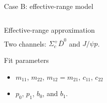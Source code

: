 \documentclass[aspectratio=169]{beamer}
\begin{document}
\begin{frame}[noframenumbering]{Case B: effective-range model}
\begin{columns}
\begin{column}{0.57\textwidth}
\begin{block}{Effective-range approximation}
\begin{align*}
            \end{align*}
            Two channels: $\Sigma_c^+ \bar{D}^0$ and $J/\psi p$.
        \end{block}
        \begin{exampleblock}{Fit parameters}
            \begin{itemize}
                \item $m_{11}$, $m_{22}$, $m_{12}=m_{21}$, $c_{11}$, $c_{22}$
                \item $p_0$, $p_1$, $b_0$, and $b_1$.
            \end{itemize}
        \end{exampleblock}
    \end{column}
\end{columns}
\end{frame}
\end{document}
